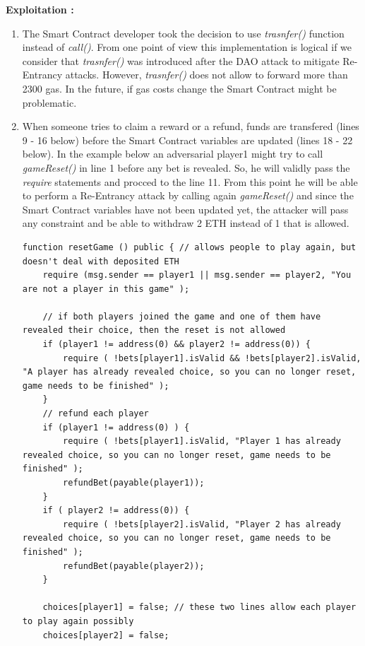 \documentclass[12pt,a4paper]{article}
\begin{document}
\textbf{Exploitation :} 

\begin{enumerate}
    \item The Smart Contract developer took the decision to use \emph{trasnfer()} function instead
    of \emph{call()}. From one point of view this implementation is logical if we consider that \emph{trasnfer()}
    was introduced after the DAO attack to mitigate Re-Entrancy attacks. However, \emph{trasnfer()}
    does not allow to forward more than 2300 gas.
    In the future, if gas costs change the Smart Contract might be problematic.
    \item When someone tries to claim a reward or a refund, funds are
    transfered (lines 9 - 16 below) before the Smart Contract variables are updated (lines 18 - 22 below). In the example below an 
    adversarial player1 might try to call \emph{gameReset()} in line 1 before any bet is revealed.
    So, he will validly pass the \emph{require} statements and procced to the line 11. From this
    point he will be able to perform a Re-Entrancy attack by calling again \emph{gameReset()}
    and since the Smart Contract variables have not been updated yet, the attacker will pass any constraint
    and be able to withdraw 2 ETH instead of 1 that is allowed. \\
\begin{lstlisting}
function resetGame () public { // allows people to play again, but doesn't deal with deposited ETH
    require (msg.sender == player1 || msg.sender == player2, "You are not a player in this game" );

    // if both players joined the game and one of them have revealed their choice, then the reset is not allowed
    if (player1 != address(0) && player2 != address(0)) {
        require ( !bets[player1].isValid && !bets[player2].isValid, "A player has already revealed choice, so you can no longer reset, game needs to be finished" );
    }
    // refund each player
    if (player1 != address(0) ) {
        require ( !bets[player1].isValid, "Player 1 has already revealed choice, so you can no longer reset, game needs to be finished" );
        refundBet(payable(player1));
    }
    if ( player2 != address(0)) {
        require ( !bets[player2].isValid, "Player 2 has already revealed choice, so you can no longer reset, game needs to be finished" );
        refundBet(payable(player2));
    }

    choices[player1] = false; // these two lines allow each player to play again possibly
    choices[player2] = false;


\end{lstlisting}
\end{enumerate}
\end{document}

